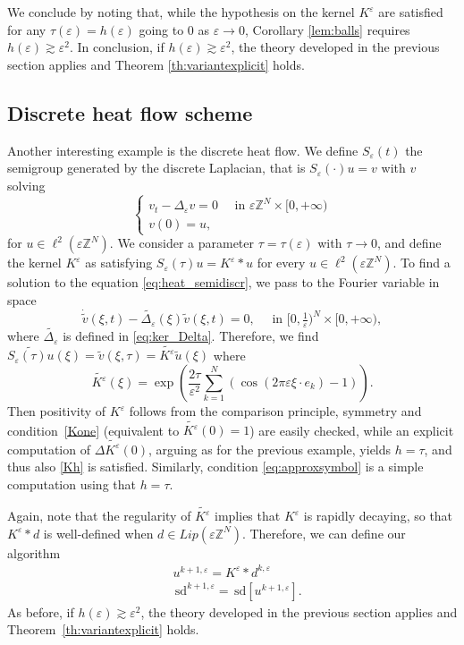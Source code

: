\documentclass[10pt]{amsart}
\theoremstyle{plain}
\theoremstyle{definition}
\newcommand{\Z}{\mathbb{Z}}
\newcommand{\e}{\varepsilon}
\newcommand{\sd}{\,\mathrm{sd}}
\newcommand{\ez}{\e\Z^N}
\numberwithin{equation}{section}
\begin{document}
We conclude by noting that, while the hypothesis on the kernel $K^\e$ are satisfied for any $\tau(\e)=h(\e)$ going to 0 as $\e\to0$, Corollary \ref{lem:balls} requires $h(\e)\gtrsim \e^2$. In conclusion, if $h(\e)\gtrsim \e^2$,  the theory developed in the previous section applies and Theorem \ref{th:variantexplicit} holds.



\subsection*{Discrete heat flow scheme}
Another interesting example is the discrete heat flow. We  define $S_\e(t)$ the semigroup generated by the discrete Laplacian, that is $ S_\e(\cdot)u=v$ with $v$ solving
\begin{equation}\label{eq:heat_semidiscr}
    \begin{cases}
     v_t - \Delta_\e v=0\quad \text{ in }\ez\times[0,+\infty)\\
     v(0)=u,
   \end{cases}   
\end{equation}
for $u\in\ell^2(\ez)$.
We consider a parameter $\tau=\tau(\e)$ with $\tau\to 0$, and define the kernel  $K^\e$ as satisfying $S_\e(\tau)u=K^\e\ast u$ for every $u\in\ell^2(\ez)$. 
To find a solution to the equation \eqref{eq:heat_semidiscr}, we pass to the Fourier variable in space 
\[
    \dot{\widetilde{v}}(\xi,t)- \widetilde{\Delta_\e}(\xi) \widetilde v(\xi,t)=0, \quad \text{ in }[0,\tfrac1\e)^N\times [0,+\infty),
\]
where  $\widetilde{\Delta_\e}$ is defined in \eqref{eq:ker_Delta}.
Therefore, we find $\widetilde{S_\e(\tau)u}(\xi)=\widetilde{v}(\xi,\tau)=\widetilde{K^\e}\widetilde{u}(\xi)$ where 
\[
    \widetilde{K^\e}(\xi)=\exp\left(\frac{2\tau}{\e^2}\sum_{k=1}^N (\cos(2\pi\e  \xi\cdot e_k)-1)\right).
\]
Then positivity of $K^\e$ follows from the comparison principle, symmetry and condition~\eqref{Kone} (equivalent to $\widetilde{K^\e}(0)=1$) are easily checked, while an explicit computation of $\Delta \widetilde{K^\e}(0)$, arguing as for the previous example, yields $h=\tau$, and thus also \eqref{Kh} is satisfied. Similarly, condition \eqref{eq:approxsymbol} is a simple computation using that $h=\tau$.

Again, note that the regularity of  $\widetilde{K^\e}$ implies that $K^\e$ is rapidly decaying, so that $K^\e\ast d$ is well-defined when $d\in Lip(\ez)$. Therefore, we can define our algorithm
\begin{equation*}
    \begin{split}
    &u^{k+1,\e} = K^\e\ast d^{k,\e}\\
    &\sd^{k+1,\e}=\sd[u^{k+1,\e} ].
\end{split}
\end{equation*}
As before,  if $h(\e)\gtrsim \e^2$,  the theory developed in the previous section applies and Theorem~\ref{th:variantexplicit} holds.
\end{document}
